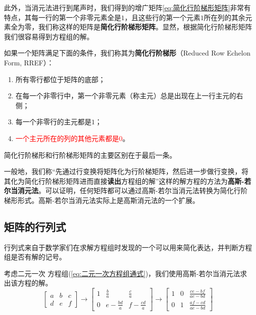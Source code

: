此外，当消元法进行到尾声时，我们得到的增广矩阵\ref{eq:简化行阶梯形矩阵}非常有特点，其每一行的第一个非零元素全是$1$，且这些行的第一个元素$1$所在列的其余元素全为零，我们称这样的矩阵是\textcolor{third}{\bf 简化行阶梯形矩阵}。显然，根据简化行阶梯形矩阵我们很容易得到方程组的解。

\begin{definition}[简化行阶梯形]
    如果一个矩阵满足下面的条件，我们称其为{\bf 简化行阶梯形}（Reduced Row Echelon Form, RREF）：
\begin{enumerate}
    \item 所有零行都位于矩阵的底部；
    \item 在每一个非零行中，第一个非零元素（称主元）总是出现在上一行主元的右侧；
    \item 每一个非零行的主元都是$1$；
    \item \textcolor{red}{一个主元所在的列的其他元素都是$0$}。
\end{enumerate}

简化行阶梯形和行阶梯形矩阵的主要区别在于最后一条。

\end{definition}

一般地，我们称\textcolor{second}{“先通过行变换将矩阵化为行阶梯矩阵，然后进一步做行变换，将其化为简化行阶梯形矩阵进而直接\textbf{读出}方程组的解”}这样的解方程的方法为\textcolor{third}{\bf 高斯-若尔当消元法}。可以证明，任何矩阵都可以通过高斯-若尔当消元法转换为简化行阶梯形形式。高斯-若尔当消元法实际上是高斯消元法的一个扩展。

\subsection{矩阵的行列式}

\begin{note}
    行列式来自于数学家们在求解方程组时发现的一个可以用来简化表达，并判断方程组是否有解的记号。
\end{note}

\vspace*{0.3cm}

考虑二元一次    方程组(\ref{eq:二元一次方程组通式})，我们使用高斯-若尔当消元法求出该方程的解。
\begin{equation*}
\left[
\begin{array}{cc|c}
a & b & c \\
d & e & f
\end{array}
\right]
\xrightarrow{}
    \left[
    \begin{array}{cc|c}
1 & \frac{b}{a} & \frac{c}{a} \\
0 & e - \frac{bd}{a} & f - \frac{cd}{a}
\end{array}
\right]
\xrightarrow{}
\left[
\begin{array}{cc|c}
1 & 0 & \frac{ce - bf}{ae - bd} \\
0 & 1 & \frac{af - cd}{ae - bd}
\end{array}
\right]
\end{equation*}

